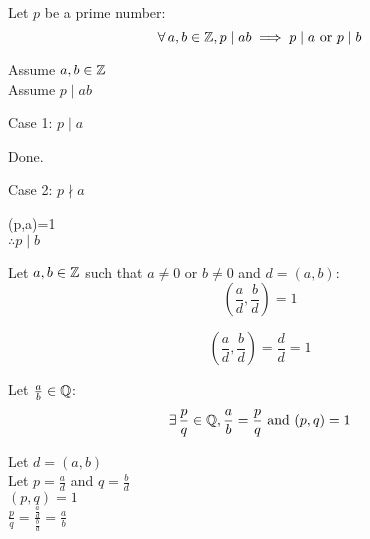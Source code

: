\documentclass[letterpaper,12pt,fleqn]{article}
\begin{document}
\begin{corollary}
  Let $p$ be a prime number:
  \[\forall\,a,b\in\mathbb{Z},p\mid ab\implies p\mid a\ \mbox{or}\ p\mid b\]
\end{corollary}

\begin{theproof}
  Assume $a,b\in\mathbb{Z}$ \\
  Assume $p\mid ab$ \\
  \begin{description}
  \item{Case 1: $p\mid a$}

    Done.
    
  \item{Case 2: $p\nmid a$}

    (p,a)=1 \\
    $\therefore p\mid b$
  \end{description}
\end{theproof}

\begin{corollary}
  Let $a,b\in\mathbb{Z}$ such that $a\ne0$ or $b\ne0$ and $d=(a,b)$:
  \[(\frac{a}{d},\frac{b}{d})=1\]
\end{corollary}

\begin{theproof}
  \[(\frac{a}{d},\frac{b}{d})=\frac{d}{d}=1\]
\end{theproof}

\begin{corollary}
  Let $\frac{a}{b}\in\mathbb{Q}$:
  \[\exists\,\frac{p}{q}\in\Q,\frac{a}{b}=\frac{p}{q}\ \mbox{and}\ (p,q)=1\]
\end{corollary}

\begin{theproof}
  Let $d=(a,b)$ \\
  Let $p=\frac{a}{d}$ and $q=\frac{b}{d}$ \\
  $(p,q)=1$ \\
  $\frac{p}{q}=\frac{\frac{a}{d}}{\frac{b}{d}}=\frac{a}{b}$
\end{theproof}
\end{document}
